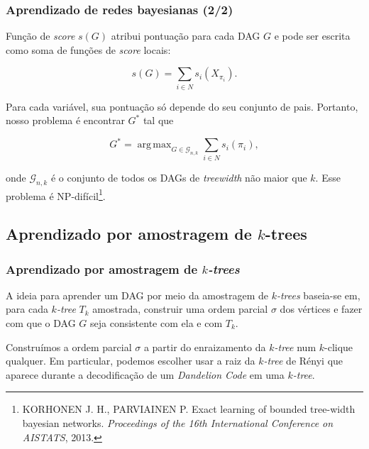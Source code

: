 \documentclass{beamer}
\DeclareMathOperator*{\argmax}{arg\,max}
\begin{document}
  \begin{frame}[fragile=singleslide]
    \frametitle{Aprendizado de redes bayesianas (2/2)}

    Função de \emph{score} $s(G)$ atribui pontuação para cada DAG $G$ e pode ser escrita como soma de funções de \emph{score} locais:

    {\footnotesize
    $$s(G) = \sum_{i \in N} s_i(X_{\pi_i}).$$
    }

    Para cada variável, sua pontuação só depende do seu conjunto de pais. Portanto, nosso problema é encontrar $G^*$ tal que

    {\footnotesize
    $$G^* = \argmax_{G \in \mathcal{G}_{n,k}} \sum_{i \in N} s_i(\pi_i),$$
    }

    onde $\mathcal{G}_{n,k}$ é o conjunto de todos os DAGs de \emph{treewidth} não maior que $k$. Esse problema é NP-difícil\footnote{\scriptsize KORHONEN J. H., PARVIAINEN P. Exact learning of bounded tree-width bayesian networks. \emph{Proceedings of the 16th International Conference on AISTATS}, 2013.}.
  \end{frame}

  \subsection{Aprendizado por amostragem de $k$-trees}

  \begin{frame}
    \frametitle{Aprendizado por amostragem de \emph{$k$-trees}}

    A ideia para aprender um DAG por meio da amostragem de \emph{$k$-trees} baseia-se em, para cada \emph{$k$-tree} $T_k$ amostrada, construir uma ordem parcial $\sigma$ dos vértices e fazer com que o DAG $G$ seja consistente com ela e com $T_k$.

    \vspace{1em}

    Construímos a ordem parcial $\sigma$ a partir do enraizamento da \emph{$k$-tree} num $k$-clique qualquer. Em particular, podemos escolher usar a raiz da \emph{$k$-tree} de Rényi que aparece durante a decodificação de um \emph{Dandelion Code} em uma \emph{$k$-tree}.
  \end{frame}
\end{document}
